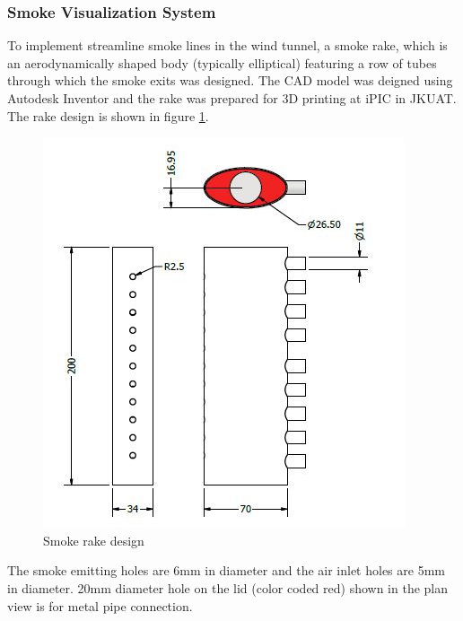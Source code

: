 \subsubsection{Smoke Visualization System}
To implement streamline smoke lines in the wind tunnel, a smoke rake, which is an aerodynamically shaped
body (typically elliptical) featuring a row of tubes through which the smoke exits was designed.
The CAD model was deigned using Autodesk Inventor and the rake was prepared for 3D printing at iPIC
in JKUAT. The rake design is shown in figure \ref{smoke}.
\begin{center}
	\begin{figure}[H]
		\centering
		\includegraphics[width=0.7\linewidth]{Figures/smoke and rake.JPG}
		\caption[Smoke Rake]{Smoke rake design}
		\label{smoke}
	\end{figure}
\end{center}
The smoke emitting holes are 6mm in diameter and the air inlet holes are 5mm in diameter.
20mm diameter hole on the lid (color coded red) shown in the  plan view is for metal pipe connection.

